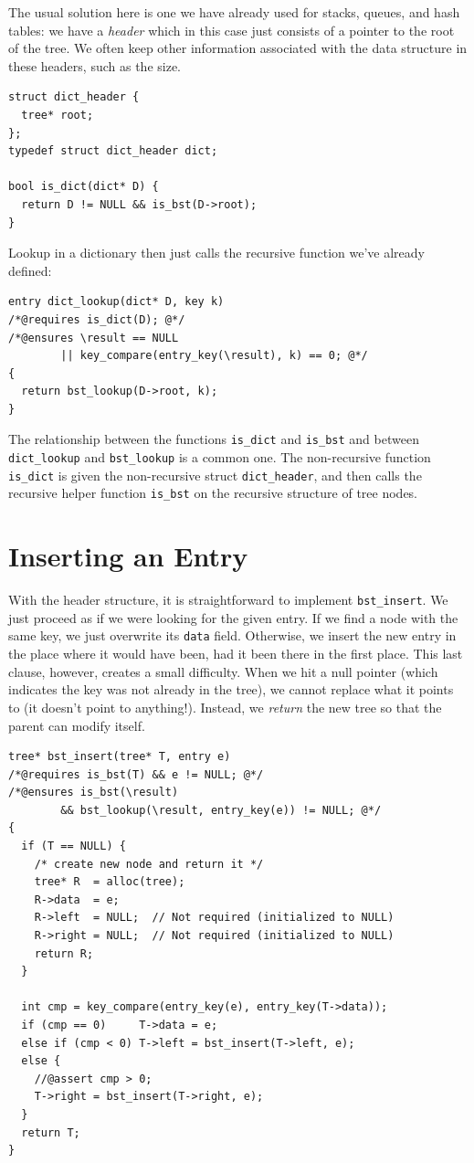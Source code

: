 The usual solution here is one we have already used for stacks,
queues, and hash tables: we have a \emph{header} which in this case
just consists of a pointer to the root of the tree.  We often keep
other information associated with the data structure in these headers,
such as the size.

\begin{lstlisting}[language={[C0]C}]
struct dict_header {
  tree* root;
};
typedef struct dict_header dict;

bool is_dict(dict* D) {
  return D != NULL && is_bst(D->root);
}
\end{lstlisting}
Lookup in a dictionary then just calls the recursive function
we've already defined:
\begin{lstlisting}[language={[C0]C}]
entry dict_lookup(dict* D, key k)
/*@requires is_dict(D); @*/
/*@ensures \result == NULL
        || key_compare(entry_key(\result), k) == 0; @*/
{
  return bst_lookup(D->root, k);
}
\end{lstlisting}
The relationship between the functions \lstinline'is_dict' and
\lstinline'is_bst' and between \lstinline'dict_lookup' and
\lstinline'bst_lookup' is a common one. The non-recursive function
\lstinline'is_dict' is given the non-recursive struct
\lstinline'dict_header', and then calls the recursive helper function
\lstinline'is_bst' on the recursive structure of tree nodes.


\section{Inserting an Entry}
\label{sec:bst:insertion}

With the header structure, it is straightforward to implement
\lstinline'bst_insert'.  We just proceed as if we were looking for the
given entry. If we find a node with the same key, we just overwrite
its \lstinline'data' field.  Otherwise, we insert the new entry in
the place where it would have been, had it been there in the first
place.  This last clause, however, creates a small difficulty.  When
we hit a null pointer (which indicates the key was not already in the
tree), we cannot replace what it points to (it doesn't point to
anything!).  Instead, we \emph{return} the new tree so that the parent
can modify itself.

\newpage
\begin{lstlisting}[language={[C0]C}]
tree* bst_insert(tree* T, entry e)
/*@requires is_bst(T) && e != NULL; @*/
/*@ensures is_bst(\result)
        && bst_lookup(\result, entry_key(e)) != NULL; @*/
{
  if (T == NULL) {
    /* create new node and return it */
    tree* R  = alloc(tree);
    R->data  = e;
    R->left  = NULL;  // Not required (initialized to NULL)
    R->right = NULL;  // Not required (initialized to NULL)
    return R;
  }

  int cmp = key_compare(entry_key(e), entry_key(T->data));
  if (cmp == 0)     T->data = e;
  else if (cmp < 0) T->left = bst_insert(T->left, e);
  else {
    //@assert cmp > 0;
    T->right = bst_insert(T->right, e);
  }
  return T;
}
\end{lstlisting}

